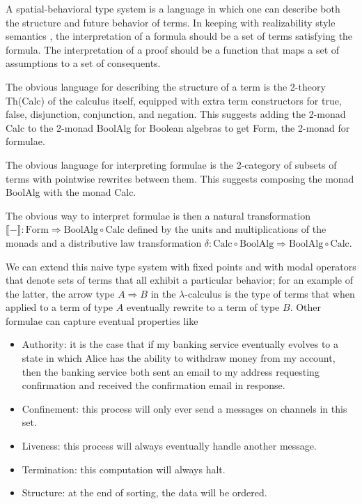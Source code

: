 \documentclass{llncs}
\newcommand{\interp}[1]{\llbracket #1 \rrbracket}
\newcommand{\maps}{\colon}
\newcommand{\Calc}{\mathrm{Calc}}
\newcommand{\BoolAlg}{\mathrm{BoolAlg}}
\renewcommand{\Form}{\mathrm{Form}}
\begin{document}
  A spatial-behavioral type system is a language in which one can describe both the structure and future behavior of terms.  In keeping with realizability style semantics  \cite{Krivine-TheCurryHowardCorre}, the interpretation of a formula should be a set of terms satisfying the formula.  The interpretation of a proof should be a function that maps a set of assumptions to a set of consequents.

  The obvious language for describing the structure of a term is the 2-theory Th(Calc) of the calculus itself, equipped with extra term constructors for true, false, disjunction, conjunction, and negation.  This suggests adding the 2-monad Calc to the 2-monad BoolAlg for Boolean algebras to get Form, the 2-monad for formulae.

  The obvious language for interpreting formulae is the 2-category of subsets of terms with pointwise rewrites between them.  This suggests composing the monad BoolAlg with the monad Calc.

  The obvious way to interpret formulae is then a natural transformation $\interp{-} \maps \Form \Rightarrow \BoolAlg \circ \Calc$ defined by the units and multiplications of the monads and a distributive law transformation $\delta\maps \Calc \circ \BoolAlg \Rightarrow \BoolAlg \circ \Calc.$

  We can extend this naive type system with fixed points and with modal operators that denote sets of terms that all exhibit a particular behavior; for an example of the latter, the arrow type $A \Rightarrow B$ in the $\lambda$-calculus is the type of terms that when applied to a term of type $A$ eventually rewrite to a term of type $B$.  Other formulae can capture eventual properties like
\begin{itemize}
  \item Authority: it is the case that if my banking service eventually evolves to a state in which Alice has the ability to withdraw money from my account, then the banking service both sent an email to my address requesting confirmation and received the confirmation email in response.
  \item Confinement: this process will only ever send a messages on channels in this set.
  \item Liveness: this process will always eventually handle another message.
  \item Termination: this computation will always halt.
  \item Structure: at the end of sorting, the data will be ordered.
\end{itemize}
\end{document}
